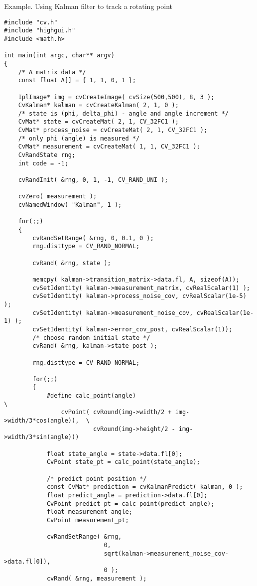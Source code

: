 \ifC
Example. Using Kalman filter to track a rotating point
\begin{lstlisting}
#include "cv.h"
#include "highgui.h"
#include <math.h>

int main(int argc, char** argv)
{
    /* A matrix data */
    const float A[] = { 1, 1, 0, 1 };

    IplImage* img = cvCreateImage( cvSize(500,500), 8, 3 );
    CvKalman* kalman = cvCreateKalman( 2, 1, 0 );
    /* state is (phi, delta_phi) - angle and angle increment */
    CvMat* state = cvCreateMat( 2, 1, CV_32FC1 );
    CvMat* process_noise = cvCreateMat( 2, 1, CV_32FC1 );
    /* only phi (angle) is measured */
    CvMat* measurement = cvCreateMat( 1, 1, CV_32FC1 );
    CvRandState rng;
    int code = -1;

    cvRandInit( &rng, 0, 1, -1, CV_RAND_UNI );

    cvZero( measurement );
    cvNamedWindow( "Kalman", 1 );

    for(;;)
    {
        cvRandSetRange( &rng, 0, 0.1, 0 );
        rng.disttype = CV_RAND_NORMAL;

        cvRand( &rng, state );

        memcpy( kalman->transition_matrix->data.fl, A, sizeof(A));
        cvSetIdentity( kalman->measurement_matrix, cvRealScalar(1) );
        cvSetIdentity( kalman->process_noise_cov, cvRealScalar(1e-5) );
        cvSetIdentity( kalman->measurement_noise_cov, cvRealScalar(1e-1) );
        cvSetIdentity( kalman->error_cov_post, cvRealScalar(1));
        /* choose random initial state */
        cvRand( &rng, kalman->state_post );

        rng.disttype = CV_RAND_NORMAL;

        for(;;)
        {
            #define calc_point(angle)                                      \
                cvPoint( cvRound(img->width/2 + img->width/3*cos(angle)),  \
                         cvRound(img->height/2 - img->width/3*sin(angle)))

            float state_angle = state->data.fl[0];
            CvPoint state_pt = calc_point(state_angle);

            /* predict point position */
            const CvMat* prediction = cvKalmanPredict( kalman, 0 );
            float predict_angle = prediction->data.fl[0];
            CvPoint predict_pt = calc_point(predict_angle);
            float measurement_angle;
            CvPoint measurement_pt;

            cvRandSetRange( &rng,
                            0,
                            sqrt(kalman->measurement_noise_cov->data.fl[0]),
                            0 );
            cvRand( &rng, measurement );


\end{lstlisting}
